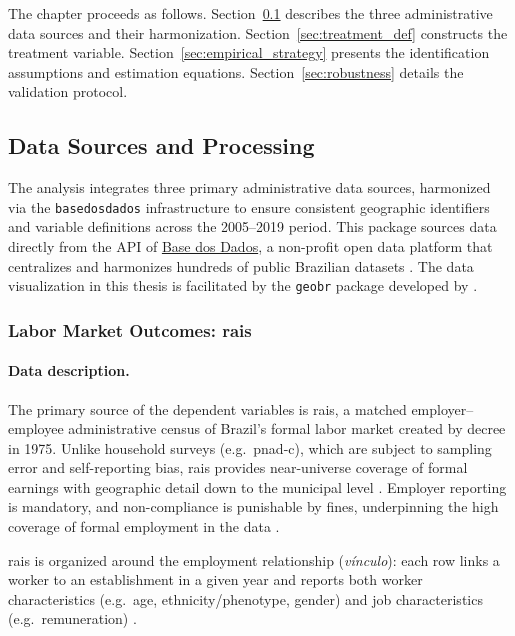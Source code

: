The chapter proceeds as follows. Section~\ref{sec:data_processing} describes the three administrative data sources and their harmonization. Section~\ref{sec:treatment_def} constructs the treatment variable. Section~\ref{sec:empirical_strategy} presents the identification assumptions and estimation equations. Section~\ref{sec:robustness} details the validation protocol.


\subsection{Data Sources and Processing}
\label{sec:data_processing}

The analysis integrates three primary administrative data sources, harmonized via the \texttt{basedosdados} infrastructure \cite{R-basedosdados} to ensure consistent geographic identifiers and variable definitions across the 2005--2019 period. This package sources data directly from the API of \href{https://basedosdados.org/}{Base dos Dados}, a non-profit open data platform that centralizes and harmonizes hundreds of public Brazilian datasets \cite{basedosdados.org, Dahis2022}. The data visualization in this thesis is facilitated by the \texttt{geobr} package developed by .

\subsubsection{Labor Market Outcomes: \acrshort{rais}}

\paragraph{Data description.}
The primary source of the dependent variables is \acrfull{rais}, a matched employer--employee administrative census of Brazil's formal labor market created by decree in 1975. Unlike household surveys (e.g.\ \acrshort{pnad-c}), which are subject to sampling error and self-reporting bias, \acrshort{rais} provides near-universe coverage of formal earnings with geographic detail down to the municipal level \cite{rais-sumario, rais-ibge, DixCarneiro2018}. Employer reporting is mandatory, and non-compliance is punishable by fines, underpinning the high coverage of formal employment in the data \cite{EngbomEtAl2022}.

\acrshort{rais} is organized around the employment relationship (\emph{vínculo}): each row links a worker to an establishment in a given year and reports both worker characteristics (e.g.\ age, ethnicity/phenotype, gender) and job characteristics (e.g.\ remuneration) \cite{rais-sumario}.

